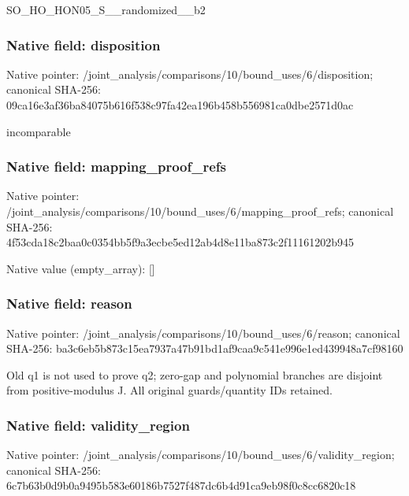 \documentclass[10pt,a4paper]{article}
\begin{document}
\begingroup\raggedright\sloppy SO\_\allowbreak{}HO\_\allowbreak{}HON05\_\allowbreak{}S\_\allowbreak{}\_\allowbreak{}randomized\_\allowbreak{}\_\allowbreak{}b2\par\endgroup

\subsubsection{Native field: disposition}
Native pointer: /joint\_\allowbreak{}analysis/comparisons/10/bound\_\allowbreak{}uses/6/disposition; canonical SHA-256: 09ca16e3af36ba84075b616f538c97fa42ea196b458b556981ca0dbe2571d0ac

\begingroup\raggedright\sloppy incomparable\par\endgroup

\subsubsection{Native field: mapping\_\allowbreak{}proof\_\allowbreak{}refs}
Native pointer: /joint\_\allowbreak{}analysis/comparisons/10/bound\_\allowbreak{}uses/6/mapping\_\allowbreak{}proof\_\allowbreak{}refs; canonical SHA-256: 4f53cda18c2baa0c0354bb5f9a3ecbe5ed12ab4d8e11ba873c2f11161202b945

Native value (empty\_\allowbreak{}array): []

\subsubsection{Native field: reason}
Native pointer: /joint\_\allowbreak{}analysis/comparisons/10/bound\_\allowbreak{}uses/6/reason; canonical SHA-256: ba3c6eb5b873c15ea7937a47b91bd1af9caa9c541e996e1ed439948a7cf98160

\begingroup\raggedright\sloppy Old q1 is not used to prove q2;\allowbreak{} zero-gap and polynomial branches are disjoint from positive-modulus J. All original guards/\allowbreak{}quantity IDs retained.\par\endgroup

\subsubsection{Native field: validity\_\allowbreak{}region}
Native pointer: /joint\_\allowbreak{}analysis/comparisons/10/bound\_\allowbreak{}uses/6/validity\_\allowbreak{}region; canonical SHA-256: 6c7b63b0d9b0a9495b583e60186b7527f487dc6b4d91ca9eb98f0c8cc6820c18
\end{document}
